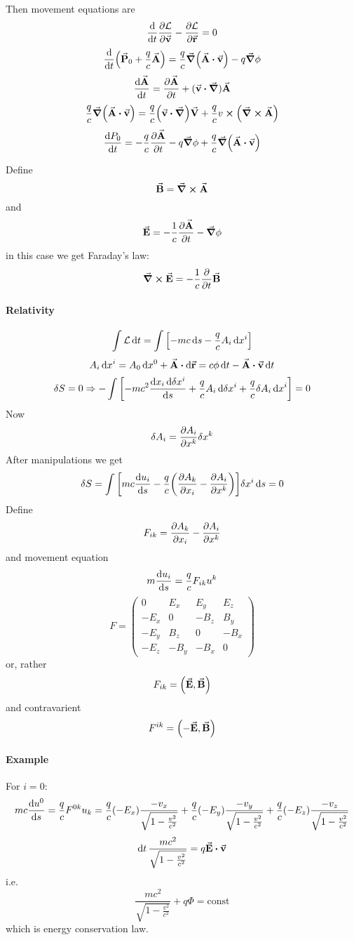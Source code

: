 Then movement equations are
$$\dv{t} \pdv{\mathcal{L}}{\va{v}} - \pdv{\mathcal{L}}{\va{r}} = 0$$
$$\dv{t} \qty(\va{P}_0+\frac{q}{c}\va{A}) = \frac{q}{c} \grad(\va{A} \vdot \va{v}) - q\grad{\phi}$$
$$\dv{\va{A}}{t} = \pdv{\va{A}}{t} + (\va{v} \vdot \grad)\va{A}$$
$$\frac{q}{c}\grad(\va{A} \vdot \va{v}) = \frac{q}{c} \qty(\va{v} \vdot \grad) \va{V} + \frac{q}{c} v \cross \qty(\curl{\va{A}})$$
$$\dv{P_0}{t} = -\frac{q}{c} \pdv{\va{A}}{t} - q\grad{\phi} + \frac{q}{c} \grad(\va{A} \vdot \va{v})$$

Define
$$\va{B} = \curl{\va{A}}$$
and
$$\va{E} = -\frac{1}{c} \pdv{\va{A}}{t} - \grad{\phi}$$
in this case we get Faraday's law:
$$\curl{\va{E}} = -\frac{1}{c} \pdv{t} \va{B}$$
\paragraph{Relativity}
$$\int \mathcal{L} \dd{t} = \int \qty[-mc\dd{s} -\frac{q}{c} A_i \dd{x^i}]$$
$$A_i\dd{x^i} =A_0\dd{x^0} + \va{A} \vdot \dd{\va{r}} = c\phi \dd{t} - \va{A} \vdot \va{v}\dd{t} $$
$$\delta S = 0 \Rightarrow -\int \qty[-mc^2 \frac{\dd{x_i}\dd{\delta x^i}}{\dd{s}} + \frac{q}{c} A_i \dd{\delta x^i} + \frac{q}{c} \delta A_i \dd{x^i}] = 0$$
Now
$$\delta A_i = \pdv{A_i}{x^k}\delta x^k$$
After manipulations we get
$$\delta S = \int \qty[mc\dv{u_i}{s} - \frac{q}{c}\qty(\pdv{A_k}{x_i} - \pdv{A_i}{x^k})] \delta x^i \dd{s} = 0$$
Define
$$F_{ik} = \pdv{A_k}{x_i} - \pdv{A_i}{x^k} $$
and movement equation 
$$m\dv{u_i}{s} = \frac{q}{c} F_{ik} u^k$$
$$F = \begin{pmatrix}
0&E_x&E_y&E_z\\
-E_x&0&-B_z&B_y\\
-E_y&B_z&0&-B_x\\
-E_z&-B_y&-B_x&0
\end{pmatrix}$$
or, rather
$$F_{ik} = \qty(\va{E}, \va{B})$$
and contravarient
$$F^{ik} = \qty(-\va{E}, \va{B})$$
\paragraph{Example}
For $i=0$:
$$mc \dv{u^0}{s} = \frac{q}{c} F^{0k}u_k = \frac{q}{c} (-E_x)\frac{-v_x}{\sqrt{1-\frac{v^2}{c^2}}}+\frac{q}{c} (-E_y)\frac{-v_y}{\sqrt{1-\frac{v^2}{c^2}}}+\frac{q}{c} (-E_z)\frac{-v_z}{\sqrt{1-\frac{v^2}{c^2}}}$$
$$\dd{t} \frac{mc^2}{\sqrt{1-\frac{v^2}{c^2}}} = q \va{E} \vdot \va{v}$$
i.e.
$$\frac{mc^2}{\sqrt{1-\frac{v^2}{c^2}}} +q\Phi = \text{const}$$
which is energy conservation law.